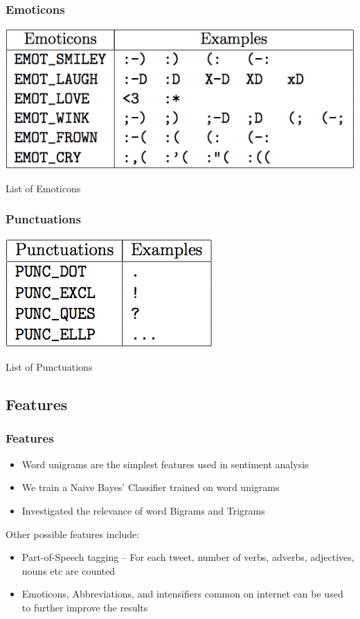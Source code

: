 \documentclass{beamer}
\begin{document}
\begin{frame}
\frametitle{Emoticons}
\begin{table}[h]
\centering
\includegraphics[scale=0.5]{img/table_emoticons.png}
\caption{List of Emoticons}
\label{table:emot}
\end{table}
\end{frame}


\begin{frame}
\frametitle{Punctuations}
\begin{table}[h]
\centering
\includegraphics[scale=0.5]{img/table_punctuations.png}
\caption{List of Punctuations}
\label{table:punc}
\end{table}
\end{frame}

\subsection{Features}

\begin{frame}
\frametitle{Features}
\begin{itemize}
\item Word unigrams are the simplest features used in sentiment analysis
\item We train a Naive Bayes' Classifier trained on word unigrams
\item Investigated the relevance of word Bigrams and Trigrams
\end{itemize}
Other possible features include:
\begin{itemize}
\item Part-of-Speech tagging -- For each tweet, number of verbs, adverbs, adjectives, nouns etc are counted
\item Emoticons, Abbreviations, and intensifiers common on internet can be used to further improve the results
\end{itemize}

\end{frame}
\end{document}
